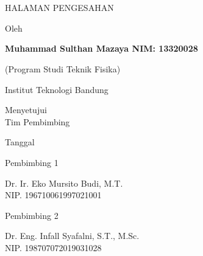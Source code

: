 \clearpage
\chapter*{} %

\begin{center}
    \begin{singlespace}
        \large \bfseries \MakeUppercase{\thetitle}

        \large \MakeUppercase{Halaman Pengesahan}

        \vspace{15mm}
        
        \normalsize \normalfont 
        Oleh

        \bfseries
        Muhammad Sulthan Mazaya \hspace{5mm} NIM: 13320028
        
        (Program Studi Teknik Fisika) \\

        \vspace{10mm}

        \normalsize \normalfont 
        Institut Teknologi Bandung \\

        \vspace{20mm}

        Menyetujui\\
        Tim Pembimbing

        \vspace{10mm}

        Tanggal \tanggalpengesahan
        
        \vspace{0.5cm}

        \begin{multicols}{2}
            Pembimbing 1

            \vspace{25mm}

            Dr. Ir. Eko Mursito Budi, M.T.\\
            NIP. 196710061997021001
            
            \columnbreak


            Pembimbing 2

            \vspace{25mm}

            Dr. Eng. Infall Syafalni, S.T., M.Sc.\\
            NIP. 198707072019031028
        \end{multicols}
    \end{singlespace}
\end{center}
\clearpage
